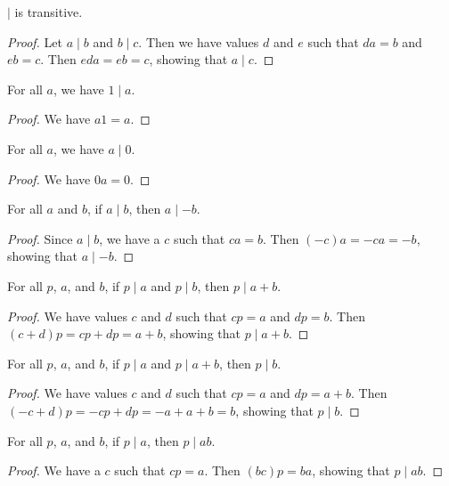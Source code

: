 \documentclass[../../math.tex]{subfiles}
\begin{document}
\begin{instance}
    $\mid$ is transitive.
\end{instance}
\begin{proof}
    Let $a \mid b$ and $b \mid c$.  Then we have values $d$ and $e$ such that
    $da = b$ and $eb = c$.  Then $eda = eb = c$, showing that $a \mid c$.
\end{proof}

\begin{theorem} \label{one_divides}
    For all $a$, we have $1 \mid a$.
\end{theorem}
\begin{proof}
    We have $a1 = a$.
\end{proof}

\begin{theorem} \label{divides_zero}
    For all $a$, we have $a \mid 0$.
\end{theorem}
\begin{proof}
    We have $0a = 0$.
\end{proof}

\begin{theorem} \label{divides_neg}
    For all $a$ and $b$, if $a \mid b$, then $a \mid -b$.
\end{theorem}
\begin{proof}
    Since $a \mid b$, we have a $c$ such that $ca = b$.  Then $(-c)a = -ca =
    -b$, showing that $a \mid -b$.
\end{proof}

\begin{theorem} \label{plus_stays_divides}
    For all $p$, $a$, and $b$, if $p \mid a$ and $p \mid b$, then $p \mid a +
    b$.
\end{theorem}
\begin{proof}
    We have values $c$ and $d$ such that $cp = a$ and $dp = b$.  Then $(c + d)p
    = cp + dp = a + b$, showing that $p \mid a + b$.
\end{proof}

\begin{theorem} \label{plus_divides_back}
    For all $p$, $a$, and $b$, if $p \mid a$ and $p \mid a + b$, then $p \mid
    b$.
\end{theorem}
\begin{proof}
    We have values $c$ and $d$ such that $cp = a$ and $dp = a + b$.  Then $(-c +
    d)p = -cp + dp = -a + a + b = b$, showing that $p \mid b$.
\end{proof}

\begin{theorem} \label{mult_factors_extend}
    For all $p$, $a$, and $b$, if $p \mid a$, then $p \mid ab$.
\end{theorem}
\begin{proof}
    We have a $c$ such that $cp = a$.  Then $(bc)p = ba$, showing that $p \mid
    ab$.
\end{proof}
\end{document}
